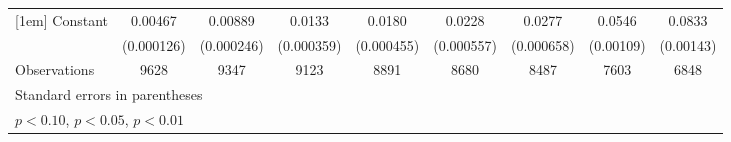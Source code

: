 \begin{table}[htbp]
\begin{tabular}{l*{8}{c}}
[1em]
Constant            &     0.00467\sym{***}&     0.00889\sym{***}&      0.0133\sym{***}&      0.0180\sym{***}&      0.0228\sym{***}&      0.0277\sym{***}&      0.0546\sym{***}&      0.0833\sym{***}\\
                    &  (0.000126)         &  (0.000246)         &  (0.000359)         &  (0.000455)         &  (0.000557)         &  (0.000658)         &   (0.00109)         &   (0.00143)         \\
\hline
Observations        &        9628         &        9347         &        9123         &        8891         &        8680         &        8487         &        7603         &        6848         \\
\hline\hline
\multicolumn{9}{l}{\footnotesize Standard errors in parentheses}\\
\multicolumn{9}{l}{\footnotesize \sym{*} \(p<0.10\), \sym{**} \(p<0.05\), \sym{***} \(p<0.01\)}\\
\end{tabular}
\end{table}
